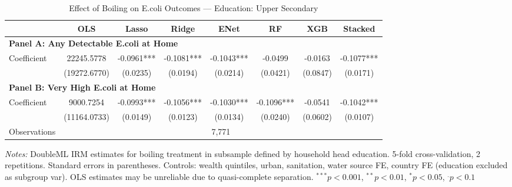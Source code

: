 \begin{table}[htbp]
\centering
\caption{Effect of Boiling on E.coli Outcomes --- Education: Upper Secondary}
\label{tab:cate_edu3}
\begin{tabular}{lccccccc}
\toprule
 & OLS & Lasso & Ridge & ENet & RF & XGB & Stacked \\
\midrule
\multicolumn{8}{l}{\textbf{Panel A: Any Detectable E.coli at Home}} \\
\midrule
Coefficient & 22245.5778 & -0.0961*** & -0.1081*** & -0.1043*** & -0.0499 & -0.0163 & -0.1077*** \\
 & (19272.6770) & (0.0235) & (0.0194) & (0.0214) & (0.0421) & (0.0847) & (0.0171) \\

\multicolumn{8}{l}{\textbf{Panel B: Very High E.coli at Home}} \\
\midrule
Coefficient & 9000.7254 & -0.0993*** & -0.1056*** & -0.1030*** & -0.1096*** & -0.0541 & -0.1042*** \\
 & (11164.0733) & (0.0149) & (0.0123) & (0.0134) & (0.0240) & (0.0602) & (0.0107) \\

\midrule
Observations & \multicolumn{7}{c}{7,771} \\
\bottomrule
\end{tabular}
\begin{minipage}{\textwidth}
\footnotesize
\textit{Notes:} DoubleML IRM estimates for boiling treatment in subsample defined by household head education. 
5-fold cross-validation, 2 repetitions. Standard errors in parentheses. 
Controls: wealth quintiles, urban, sanitation, water source FE, country FE (education excluded as subgroup var). 
OLS estimates may be unreliable due to quasi-complete separation. 
$^{***}p<0.001$, $^{**}p<0.01$, $^{*}p<0.05$, $^{.}p<0.1$
\end{minipage}
\end{table}
